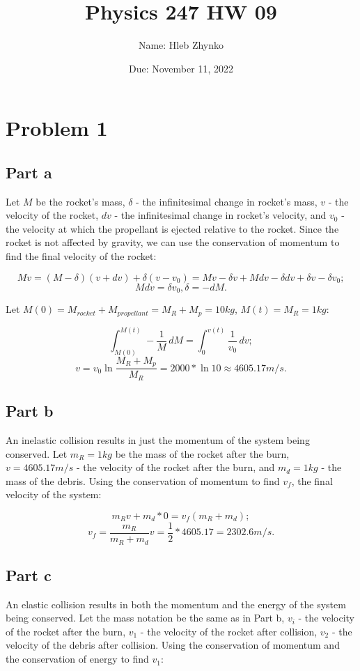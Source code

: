 \documentclass{article}
\title{Physics 247 HW 09}
\author{Name: Hleb Zhynko}
\date{Due: November 11, 2022}
\begin{document}
\maketitle

\section*{Problem 1}
\subsection*{Part a}
Let $M$ be the rocket's mass, $\delta$ - the infinitesimal change in rocket's mass, $v$ - the velocity of the rocket, $dv$ - the infinitesimal change in rocket's velocity, and $v_0$ - the velocity at which the propellant is ejected relative to the rocket. Since the rocket is not affected by gravity, we can use the conservation of momentum to find the final velocity of the rocket:

\[
Mv = (M-\delta)(v+dv) + \delta(v-v_0) = Mv - \delta v + Mdv - \delta dv + \delta v - \delta v_0;
\]
\[
Mdv = \delta v_0, \delta = -dM.
\]

Let $M(0) = M_{rocket} + M_{propellant} = M_R + M_p = 10kg$, $M(t) = M_R = 1kg$:

\[
\int_{M(0)}^{M(t)} -\frac{1}{M} \,dM = \int_{0}^{v(t)} \frac{1}{v_0} \,dv;
\]
\[
v = v_0 \ln\frac{M_R + M_p}{M_R} = 2000 * \ln10 \approx 4605.17 m/s.
\]

\subsection*{Part b}
An inelastic collision results in just the momentum of the system being conserved. Let $m_R = 1kg$ be the mass of the rocket after the burn, $v = 4605.17 m/s$ - the velocity of the rocket after the burn, and $m_d = 1kg$ - the mass of the debris. Using the conservation of momentum to find $v_f$, the final velocity of the system:

\[
m_Rv + m_d * 0 = v_f(m_R + m_d);
\]
\[
v_f = \frac{m_R}{m_R + m_d}v = \frac{1}{2} * 4605.17 = 2302.6 m/s.
\]

\subsection*{Part c}
An elastic collision results in both the momentum and the energy of the system being conserved. Let the mass notation be the same as in Part b, $v_i$ - the velocity of the rocket after the burn, $v_1$ - the velocity of the rocket after collision, $v_2$ - the velocity of the debris after collision. Using the conservation of momentum and the conservation of energy to find $v_1$:
\end{document}

